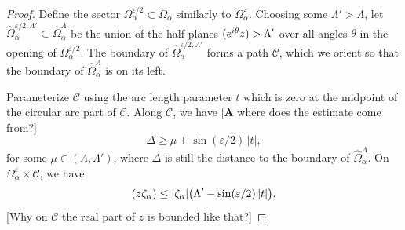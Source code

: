 \documentclass{article}
\let\Re\relax
\DeclareMathOperator{\Re}{Re}
\theoremstyle{definition}
\theoremstyle{plain}
\newenvironment{todo}{\color{Coral}}{\color{black}}
\newenvironment{draft}{\color{SlateBlue}}{\color{black}}
\begin{document}
\begin{proof}
Define the sector $\Omega_\alpha^{\varepsilon/2} \subset \Omega_\alpha$ similarly to $\Omega_\alpha^\varepsilon$. Choosing some $\Lambda' > \Lambda$, let $\widehat{\Omega}_\alpha^{\varepsilon/2, \Lambda'} \subset \widehat{\Omega}_\alpha^\Lambda$ be the union of the half-planes $\Re(e^{i\theta} z) > \Lambda'$ over all angles $\theta$ in the opening of $\Omega_\alpha^{\varepsilon/2}$. 
%
The boundary of $\widehat{\Omega}_\alpha^{\varepsilon/2, \Lambda'}$ forms a path $\mathcal{C}$, which we orient so that the boundary of $\widehat{\Omega}_\alpha^\Lambda$ is on its left.
\begin{center}
\end{center}
Parameterize $\mathcal{C}$ using the arc length parameter $t$ which is zero at the midpoint of the circular arc part of $\mathcal{C}$. \begin{draft}Along $\mathcal{C}$, we have \begin{todo}[\textbf{A} where does the estimate come from?]\end{todo}
\[ \Delta \ge \mu + \sin(\varepsilon/2)\,|t|, \]
for some $\mu \in (\Lambda, \Lambda')$, where $\Delta$ is still the distance to the boundary of $\widehat{\Omega}_\alpha^\Lambda$. On $\Omega_\alpha^\varepsilon \times \mathcal{C}$, we have
\[ \Re(z\zeta_\alpha) \le |\zeta_\alpha| \big(\Lambda' - \sin(\varepsilon/2)\,|t|\big). \]
\begin{todo}[Why on $\mathcal{C}$ the real part of $z$ is bounded like that?]\end{todo}\end{draft}


\end{proof}
\end{document}
